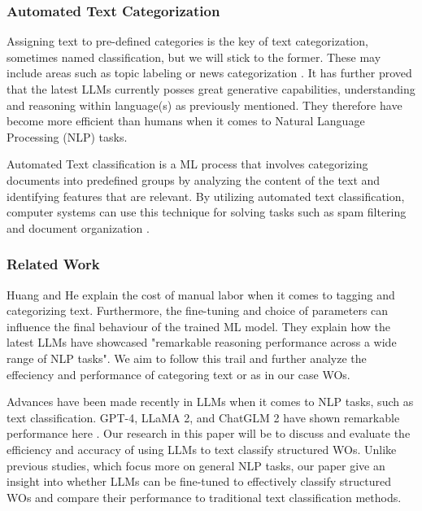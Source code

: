 \documentclass{article}
\begin{document}
\subsubsection{Automated Text Categorization}

Assigning text to pre-defined categories is the key of text categorization,
sometimes named classification, but we will stick to the former.
These may include areas such as topic labeling or news categorization \cite{zhang2024}.
It has further proved that the latest LLMs currently posses great generative capabilities,
understanding and reasoning within language(s) as previously mentioned.
They therefore have become more efficient than humans when it comes to Natural Language Processing (NLP) tasks.

Automated Text classification is a ML process that involves categorizing documents
into predefined groups by analyzing the content of the text and identifying features that are relevant.
By utilizing automated text classification, computer systems can use this technique for solving tasks such as spam
filtering and document organization \cite{dalal2011}.

\subsubsection{Related Work}

Huang and He \cite{huang2024} explain the cost of manual labor when it comes to tagging and categorizing text.
Furthermore, the fine-tuning and choice of parameters can influence the final behaviour of the trained ML model.
They explain how the latest LLMs have showcased "remarkable reasoning performance across a wide range of
NLP tasks".
We aim to follow this trail and further analyze the effeciency and performance of categoring text or as in our
case WOs.

Advances have been made recently in LLMs when it comes to NLP tasks, such as text classification.
GPT-4, LLaMA 2, and ChatGLM 2 have shown remarkable performance here \cite{zhang2024}.
Our research in this paper will be to discuss and evaluate the efficiency and accuracy of using LLMs
to text classify structured WOs. Unlike previous studies, which focus more on general NLP tasks,
our paper give an insight into whether LLMs can be fine-tuned to effectively classify structured WOs and
compare their performance to traditional text classification methods.
\end{document}
